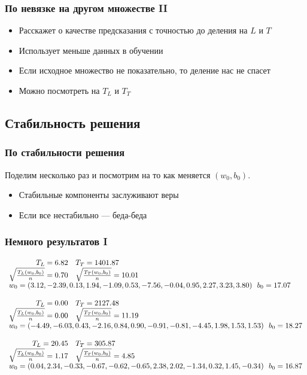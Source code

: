 \documentclass[14pt, fleqn, xcolor={dvipsnames, table}, hyperref={unicode}, babel={english,russian}, inputenc=utf8x]{beamer}
\begin{document}
\begin{frame}[t]\frametitle{По невязке на другом множестве II}
\begin{itemize}
  \item Расскажет о качестве предсказания с точностью до деления на $L$ и $T$
  \item Использует меньше данных в обучении
  \item Если исходное множество не показательно, то деление нас не спасет
  \item Можно посмотреть на $T_L$ и $T_T$
\end{itemize}
\end{frame}

\subsection{Стабильность решения}

\begin{frame}[t]\frametitle{По стабильности решения}
Поделим несколько раз и посмотрим на то как меняется $(w_0,b_0)$.
\begin{itemize}
  \item Стабильные компоненты заслуживают веры
  \item Если все нестабильно --- беда-беда
\end{itemize}
\end{frame}

\begin{frame}[t]\frametitle{Немного результатов I}
\scriptsize
$$\begin{array}{rl}
T_L= 6.82 & T_T = 1401.87 \\ 
\sqrt{\frac{T_L(w_0, b_0)}{n}} = 0.70 & \sqrt{\frac{T_T(w_0, b_0)}{n}} = 10.01 \\ 
\multicolumn{2}{l}{w_0 = (3.12, -2.39, 0.13, 1.94, -1.09, 0.53, -7.56, -0.04, 0.95, 2.27, 3.23, 3.80)~~b_0 = 17.07} \\ 
\\ 
T_L= 0.00 & T_T = 2127.48 \\ 
\sqrt{\frac{T_L(w_0, b_0)}{n}} = 0.00 & \sqrt{\frac{T_T(w_0, b_0)}{n}} = 11.19 \\ 
\multicolumn{2}{l}{w_0 = (-4.49, -6.03, 0.43, -2.16, 0.84, 0.90, -0.91, -0.81, -4.45, 1.98, 1.53, 1.53)~~b_0 = 18.27} \\ 
\\ 
T_L= 20.45 & T_T = 305.87 \\ 
\sqrt{\frac{T_L(w_0, b_0)}{n}} = 1.17 & \sqrt{\frac{T_T(w_0, b_0)}{n}} = 4.85 \\ 
\multicolumn{2}{l}{w_0 = (0.04, 2.34, -0.33, -0.67, -0.62, -0.65, 2.38, 2.02, -1.34, 0.32, 1.45, -0.34)~~b_0 = 16.87} \\ 
\end{array}$$
\end{frame}
\end{document}
